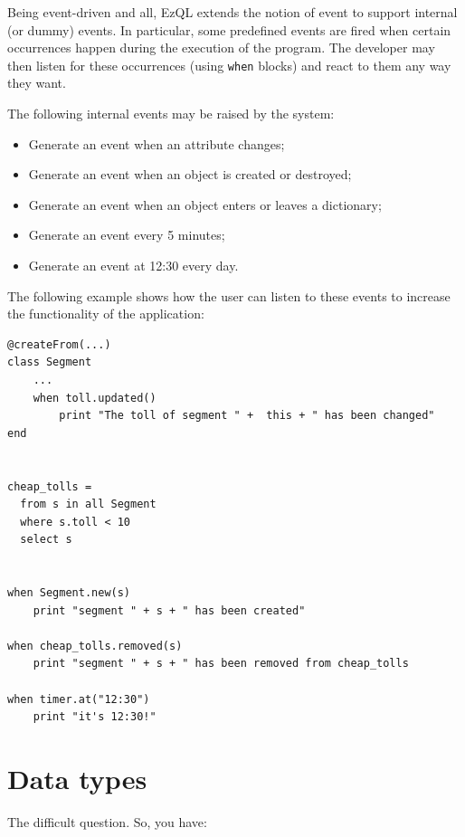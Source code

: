 \documentclass{report}
\begin{document}
Being event-driven and all, EzQL extends the notion of event to
support internal (or dummy) events. In particular, some predefined
events are fired when certain occurrences happen during the execution
of the program. The developer may then listen for these occurrences
(using \verb=when= blocks) and react to them any way they want.

The following internal events may be raised by the system:

\begin{itemize}
\item Generate an event when an attribute changes;
\item Generate an event when an object is created or destroyed;
\item Generate an event when an object enters or leaves a dictionary;
\item Generate an event every 5 minutes;
\item Generate an event at 12:30 every day.
\end{itemize}

The following example shows how the user can listen to these events to
increase the functionality of the application:

\begin{verbatim}
@createFrom(...)
class Segment
    ...
    when toll.updated()
        print "The toll of segment " +  this + " has been changed"
end


cheap_tolls =
  from s in all Segment
  where s.toll < 10
  select s


when Segment.new(s)
    print "segment " + s + " has been created"

when cheap_tolls.removed(s)
    print "segment " + s + " has been removed from cheap_tolls

when timer.at("12:30")
    print "it's 12:30!"
\end{verbatim}


\chapter{Data types}

The difficult question. So, you have:
\end{document}
